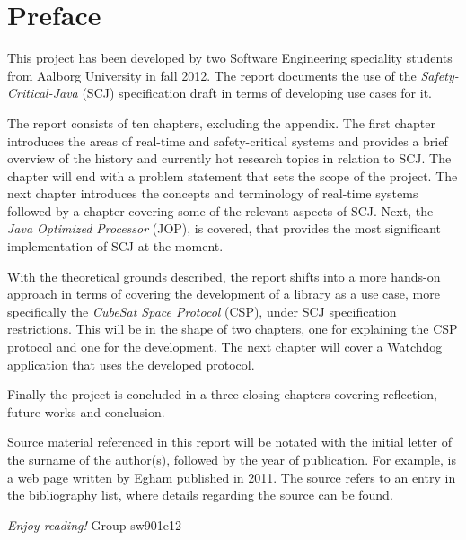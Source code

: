 \newpage
\thispagestyle{empty}
\mbox{}

\chapter*{Preface}
This project has been developed by two Software Engineering speciality students from Aalborg University in fall 2012. The report documents the use of the \textit{Safety-Critical-Java} (SCJ) specification draft in terms of developing use cases for it.

\vspace{4mm}
\noindent The report consists of ten chapters, excluding the appendix. The first chapter introduces the areas of real-time and safety-critical systems and provides a brief overview of the history and currently hot research topics in relation to SCJ. The chapter will end with a problem statement that sets the scope of the project. The next chapter introduces the concepts and terminology of real-time systems followed by a chapter covering some of the relevant aspects of SCJ. Next, the \textit{Java Optimized Processor} (JOP), is covered, that provides the most significant implementation of SCJ at the moment.

With the theoretical grounds described, the report shifts into a more hands-on approach in terms of covering the development of a library as a use case, more specifically the \textit{CubeSat Space Protocol} (CSP), under SCJ specification restrictions. This will be in the shape of two chapters, one for explaining the CSP protocol and one for the development. The next chapter will cover a Watchdog application that uses the developed protocol.

Finally the project is concluded in a three closing chapters covering reflection, future works and conclusion. 

\vspace{4mm}
\noindent Source material referenced in this report will be notated with the initial letter of the surname of the author(s), followed by the year of publication. For example, is a web page written by Egham published in 2011. The source refers to an entry in the bibliography list, where details regarding the source can be found.

\vspace{5mm}
	\begin{flushright}
\emph{Enjoy reading!} Group sw901e12
	\end{flushright}

\newpage
